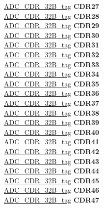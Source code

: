 \begin{DoxyCompactItemize}
\begin{tabbing}
\>\>\mbox{\hyperlink{unionADC__CDR__32B__tag}{ADC\_CDR\_32B\_tag}} {\bfseries CDR27}\\
\>\>\mbox{\hyperlink{unionADC__CDR__32B__tag}{ADC\_CDR\_32B\_tag}} {\bfseries CDR28}\\
\>\>\mbox{\hyperlink{unionADC__CDR__32B__tag}{ADC\_CDR\_32B\_tag}} {\bfseries CDR29}\\
\>\>\mbox{\hyperlink{unionADC__CDR__32B__tag}{ADC\_CDR\_32B\_tag}} {\bfseries CDR30}\\
\>\>\mbox{\hyperlink{unionADC__CDR__32B__tag}{ADC\_CDR\_32B\_tag}} {\bfseries CDR31}\\
\>\>\mbox{\hyperlink{unionADC__CDR__32B__tag}{ADC\_CDR\_32B\_tag}} {\bfseries CDR32}\\
\>\>\mbox{\hyperlink{unionADC__CDR__32B__tag}{ADC\_CDR\_32B\_tag}} {\bfseries CDR33}\\
\>\>\mbox{\hyperlink{unionADC__CDR__32B__tag}{ADC\_CDR\_32B\_tag}} {\bfseries CDR34}\\
\>\>\mbox{\hyperlink{unionADC__CDR__32B__tag}{ADC\_CDR\_32B\_tag}} {\bfseries CDR35}\\
\>\>\mbox{\hyperlink{unionADC__CDR__32B__tag}{ADC\_CDR\_32B\_tag}} {\bfseries CDR36}\\
\>\>\mbox{\hyperlink{unionADC__CDR__32B__tag}{ADC\_CDR\_32B\_tag}} {\bfseries CDR37}\\
\>\>\mbox{\hyperlink{unionADC__CDR__32B__tag}{ADC\_CDR\_32B\_tag}} {\bfseries CDR38}\\
\>\>\mbox{\hyperlink{unionADC__CDR__32B__tag}{ADC\_CDR\_32B\_tag}} {\bfseries CDR39}\\
\>\>\mbox{\hyperlink{unionADC__CDR__32B__tag}{ADC\_CDR\_32B\_tag}} {\bfseries CDR40}\\
\>\>\mbox{\hyperlink{unionADC__CDR__32B__tag}{ADC\_CDR\_32B\_tag}} {\bfseries CDR41}\\
\>\>\mbox{\hyperlink{unionADC__CDR__32B__tag}{ADC\_CDR\_32B\_tag}} {\bfseries CDR42}\\
\>\>\mbox{\hyperlink{unionADC__CDR__32B__tag}{ADC\_CDR\_32B\_tag}} {\bfseries CDR43}\\
\>\>\mbox{\hyperlink{unionADC__CDR__32B__tag}{ADC\_CDR\_32B\_tag}} {\bfseries CDR44}\\
\>\>\mbox{\hyperlink{unionADC__CDR__32B__tag}{ADC\_CDR\_32B\_tag}} {\bfseries CDR45}\\
\>\>\mbox{\hyperlink{unionADC__CDR__32B__tag}{ADC\_CDR\_32B\_tag}} {\bfseries CDR46}\\
\>\>\mbox{\hyperlink{unionADC__CDR__32B__tag}{ADC\_CDR\_32B\_tag}} {\bfseries CDR47}\\

\end{tabbing}
\end{DoxyCompactItemize}
